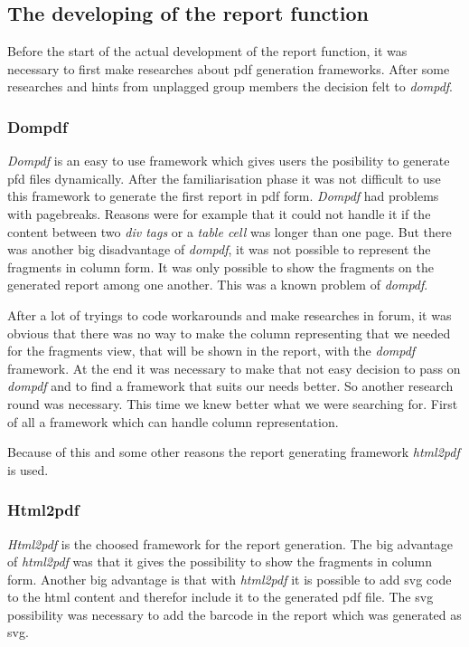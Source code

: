 \subsection{The developing of the report function}

Before the start of the actual development of the report function, it was necessary to first make researches about pdf generation frameworks. After some researches and hints from unplagged group members the decision felt to \textit{dompdf}. 

\subsubsection{Dompdf}

\textit{Dompdf} is an easy to use framework which gives users the posibility to generate pfd files dynamically. After the familiarisation phase it was not difficult to use this framework to generate the first report in pdf form. \textit{Dompdf} had problems with pagebreaks. Reasons were for example that it could not handle it if the content between two \textit{div tags} or a \textit{table cell} was longer than one page.
But there was another big disadvantage of \textit{dompdf}, it was not possible to represent the fragments in column form. It was only possible to show the fragments on the generated report among one another. This was a known problem of \textit{dompdf}.

After a lot of tryings to code workarounds and make researches in forum, it was obvious that there was no way to make the column representing that we needed for the fragments view, that will be shown in the report, with the \textit{dompdf} framework. At the end it was necessary to make that not easy decision to pass on \textit{dompdf} and to find a framework that suits our needs better.
So another research round was necessary. This time we knew better what we were searching for. First of all a framework which can handle column representation.

Because of this and some other reasons the report generating framework \textit{html2pdf} is used.

\subsubsection{Html2pdf}

\textit{Html2pdf} is the choosed framework for the report generation. The big advantage of \textit{html2pdf} was that it gives the possibility to show the fragments in column form. Another big advantage is that with \textit{html2pdf} it is possible to add svg code to the html content and therefor include it to the generated pdf file. The svg possibility was necessary to add the barcode in the report which was generated as svg.

